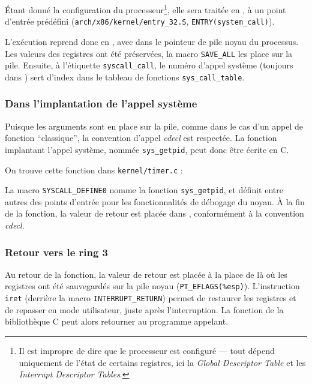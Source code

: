 Étant donné la configuration du processeur\footnote{Il est impropre de dire que
le processeur est configuré --- tout dépend uniquement de l'état de certains
registres, ici la \emph{Global Descriptor Table} et les \emph{Interrupt
Descriptor Tables}.}, elle sera traitée en , à un point d'entrée
prédéfini (\texttt{arch/x86/kernel/entry\_32.S}, \texttt{ENTRY(system\_call)}).


L'exécution reprend donc en , avec dans \esp le pointeur de pile noyau
du processus. Les valeurs des registres ont été préservées, la macro
\texttt{SAVE\_ALL} les place sur la pile. Ensuite, à l'étiquette
\texttt{syscall\_call}, le numéro d'appel système (toujours dans \eax) sert
d'index dans le tableau de fonctions \texttt{sys\_call\_table}.


\subsubsection{Dans l'implantation de l'appel système}

Puisque les arguments sont en place sur la pile, comme dans le cas d'un appel de
fonction ``classique'', la convention d'appel \emph{cdecl} est respectée. La
fonction implantant l'appel système, nommée \texttt{sys\_getpid}, peut donc être
écrite en C.

On trouve cette fonction dans \texttt{kernel/timer.c} :


La macro \texttt{SYSCALL_DEFINE0} nomme la fonction \texttt{sys\_getpid}, et
définit entre autres des points d'entrée pour les fonctionnalités de débogage du
noyau. À la fin de la fonction, la valeur de retour est placée dans \eax,
conformément à la convention \emph{cdecl}.

\subsubsection{Retour vers le ring 3}

Au retour de la fonction, la valeur de retour est placée à la place de \eax là
où les registres ont été sauvegardés sur la pile noyau
(\texttt{PT\_EFLAGS(\%esp)}). L'instruction \texttt{iret} (derrière la macro
\texttt{INTERRUPT\_RETURN}) permet de restaurer les registres et de repasser en
mode utilisateur, juste après l'interruption. La fonction de la bibliothèque C
peut alors retourner au programme appelant.


